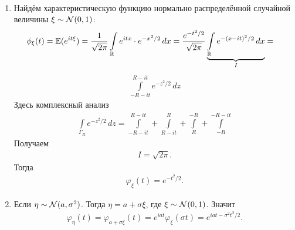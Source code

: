 \documentclass[../main.tex]{subfiles}
\begin{document}
\begin{exmpl}\
 \begin{enumerate}
  \item Найдём характеристическую функцию нормально распределённой случайной величины $ \xi \sim \mathcal N(0,1) $:
   \begin{align*}
    \phi_\xi(t) &= \mathbb E (e^{it\xi} ) = \frac{1}{\sqrt{2\pi}} \int\limits_{\mathbb{R}} e^{itx}  \cdot e^{-x^{2} / 2}\,dx = \frac{e^{-t^{2} / 2}}{\sqrt{2\pi} } \underbrace{\int\limits_{\mathbb{R}} e^{-(x-it)^{2} / 2} \,dx}_{I} = 
   \end{align*}
   \begin{align*}
    \int\limits_{-R-it}^{R-it} e^{-z^{2} / 2}\,dz
   \end{align*} Здесь комплексный анализ
   \begin{align*}
    \int\limits_{\Gamma_R}  e^{-z^{2} / 2}\,dz = \int\limits_{-R-it}^{R-it}  + \int\limits_{R-it}^{R}  + \int\limits_{R}^{-R} + \int\limits_{-R}^{-R-it} 
   \end{align*} Получаем
   \begin{align*}
    I = \sqrt{2\pi}.
   \end{align*} Тогда
   \begin{align*}
    \varphi_\xi(t) = e^{-t^{2} / 2}.
   \end{align*}
  \item Если $ \eta \sim \mathcal N(a, \sigma^{2}) $. Тогда $ \eta = a + \sigma \xi $, где $ \xi \sim \mathcal N(0,1) $. Значит
   \begin{align*}
    \varphi_\eta(t) = \varphi_{a + \sigma \xi}(t) = e^{iat} \varphi_\xi(\sigma t) = e^{iat - \sigma^{2}t^{2} / 2}.
   \end{align*}
 \end{enumerate}
\end{exmpl}
\end{document}

